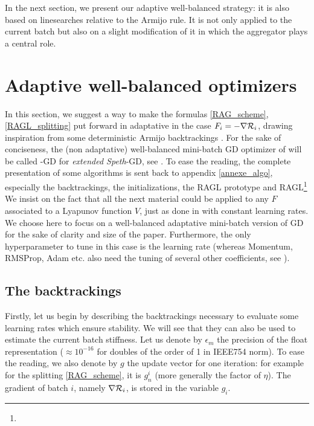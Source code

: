 In the next section, we present our adaptive well-balanced strategy: it is also based on linesearches relative to the Armijo rule. 
It is not only applied to the current batch but also on a slight
modification of it in which the aggregator plays a central role. 



\section{Adaptive well-balanced optimizers}
\label{section_optimizers}

In this section, we suggest a way to make the formulas \eqref{RAG_scheme}, \eqref{RAGL_splitting} put forward in \cite{partI} %
adaptative in the case $F_i=-\nabla \mathcal{R}_i$, drawing inspiration from some deterministic Armijo backtrackings \cite{armijo,Rondepierre,Lyap_Theory_Bilel,Bilel_thesis}. 
For the sake of conciseness, the (non adaptative) well-balanced mini-batch GD optimizer of \cite{partI} will be called \Speth-GD for {\em extended Speth}-GD, see \cite{partI}. 
{To ease the reading, the complete presentation of some algorithms is sent back to appendix \ref{annexe_algo}, especially the backtrackings, the initializations, the RAGL
prototype and RAGL\footnote{}}
We insist on the fact that all the next material could be applied to any $F$ associated to a Lyapunov function $V$, just as done in \cite{partI} with constant learning rates. We
choose here to focus on a well-balanced adaptative mini-batch version of GD for the sake of clarity and size of the paper. 
Furthermore, the only hyperparameter to tune in this case is the learning rate (whereas Momentum, RMSProp, Adam etc. also need the tuning of several other coefficients, see \cite{Bilel_thesis}). 

\subsection{The backtrackings}
Firstly, let us begin by describing the backtrackings necessary to evaluate some learning rates which ensure stability. 
We will see that they can also be used to estimate the current batch stiffness. 
Let us denote by $\epsilon_m$ the precision of the float representation
($\approx 10^{-16}$ for doubles of the order of 1 in IEEE754 norm). To ease the reading, we also denote by $g$ the update vector for one iteration: for example for the splitting \eqref{RAG_scheme}, it is
$g_n^i$ (more generally the factor of $\eta$). The gradient of batch $i$, namely $\nabla \mathcal{R}_i$, is stored in the variable $g_i$. 

